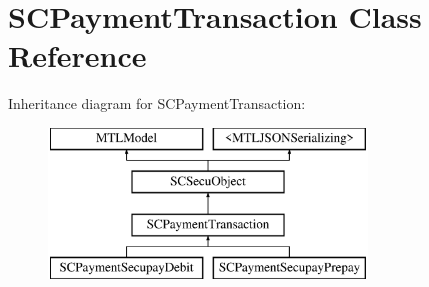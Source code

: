 \hypertarget{interface_s_c_payment_transaction}{}\section{S\+C\+Payment\+Transaction Class Reference}
\label{interface_s_c_payment_transaction}
Inheritance diagram for S\+C\+Payment\+Transaction\+:\begin{figure}[H]
\begin{center}
\leavevmode
\includegraphics[height=4.000000cm]{interface_s_c_payment_transaction}
\end{center}
\end{figure}
